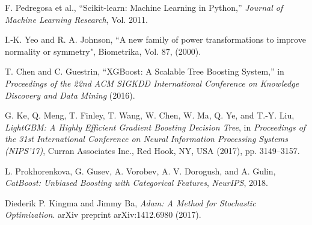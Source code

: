 \documentclass{article}
\begin{document}
\begin{thebibliography}{99}

F. Pedregosa et al., ``Scikit-learn: Machine Learning in Python,'' \emph{Journal of Machine Learning Research}, Vol. 2011. 

I.‐K. Yeo and R. A. Johnson, ``A new family of power transformations to improve normality or symmetry", Biometrika, Vol. 87, (2000).

T. Chen and C. Guestrin, ``XGBoost: A Scalable Tree Boosting System,'' in \emph{Proceedings of the 22nd ACM SIGKDD International Conference on Knowledge Discovery and Data Mining} (2016). 

G. Ke, Q. Meng, T. Finley, T. Wang, W. Chen, W. Ma, Q. Ye, and T.-Y. Liu, \textit{LightGBM: A Highly Efficient Gradient Boosting Decision Tree}, in \emph{Proceedings of the 31st International Conference on Neural Information Processing Systems (NIPS'17)}, Curran Associates Inc., Red Hook, NY, USA (2017), pp. 3149--3157.


L. Prokhorenkova, G. Gusev, A. Vorobev, A. V. Dorogush, and A. Gulin, \textit{CatBoost: Unbiased Boosting with Categorical Features},  \emph{NeurIPS}, 2018. 

Diederik P. Kingma and Jimmy Ba, 
\textit{Adam: A Method for Stochastic Optimization}.
arXiv preprint arXiv:1412.6980 (2017).
\end{thebibliography}
\end{document}
